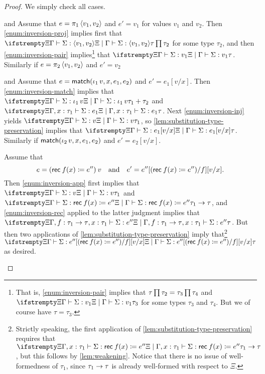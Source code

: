 \begin{proof}
We simply check all cases.
%
\begin{proofsec}
    \item[\ruleref{Eprojl} and \ruleref{Eprojr}]
    Assume that $e = \expProjl{\expPair{v_1}{v_2}}$ and $e' = v_1$ for values $v_1$ and $v_2$. Then \cref{enum:inversion-proj} implies first that $\typerel{\Xi}{\Gamma}{\Sigma}{\expPair{v_1}{v_2}}{\typeProd{\tau}{\tau_2}}$ for some type $\tau_2$, and then \cref{enum:inversion-pair} implies\footnote{That is, \cref{enum:inversion-pair} implies that $\typeProd{\tau}{\tau_2} = \typeProd{\tau_3}{\tau_4}$ and $\typerel{\Xi}{\Gamma}{\Sigma}{v_1}{\tau_3}$ for some types $\tau_3$ and $\tau_4$. But we of course have $\tau = \tau_3$.} that $\typerel{\Xi}{\Gamma}{\Sigma}{v_1}{\tau}$. Similarly if $e = \expProjr{\expPair{v_1}{v_2}}$ and $e' = v_2$

    \item[\ruleref{Ematchinjl} and \ruleref{Ematchinjr}]
    Assume that $e = \expMatch{\expInjl{v}}{x}{e_1}{e_2}$ and $e' = e_1[v/x]$. Then \cref{enum:inversion-match} implies that $\typerel{\Xi}{\Gamma}{\Sigma}{\expInjl{v}}{\typeSum{\tau_1}{\tau_2}}$ and $\typerel{\Xi}{\Gamma, \hastype{x}{\tau_1}}{\Sigma}{e_1}{\tau}$. Next \cref{enum:inversion-inj} yields $\typerel{\Xi}{\Gamma}{\Sigma}{v}{\tau_1}$, so \cref{lem:substitution-type-preservation} implies that $\typerel{\Xi}{\Gamma}{\Sigma}{e_1[v/x]}{\tau}$. Similarly if $\expMatch{\expInjr{v}}{x}{e_1}{e_2}$ and $e' = e_2[v/x]$.

    \item[\ruleref{Erecapp}]
    Assume that
    \begin{equation*}
        e = \expApp{\expRec*{f}{x}{e''}}{v}
        \quad \text{and} \quad
        e' = e''[\expRec*{f}{x}{e''}/f][v/x].
    \end{equation*}
    Then \cref{enum:inversion-app} first implies that $\typerel{\Xi}{\Gamma}{\Sigma}{v}{\tau_1}$ and $\typerel{\Xi}{\Gamma}{\Sigma}{\expRec{f}{x}{e''}}{\typeFunc{\tau_1}{\tau}}$, and \cref{enum:inversion-rec} applied to the latter judgment implies that $\typerel{\Xi}{\Gamma, \hastype{f}{\typeFunc{\tau_1}{\tau}}, \hastype{x}{\tau_1}}{\Sigma}{e''}{\tau}$. But then two applications of \cref{lem:substitution-type-preservation} imply that\footnote{Strictly speaking, the first application of \cref{lem:substitution-type-preservation} requires that $\typerel{\Xi}{\Gamma, \hastype{x}{\tau_1}}{\Sigma}{\expRec{f}{x}{e''}}{\typeFunc{\tau_1}{\tau}}$, but this follows by \cref{lem:weakening}. Notice that there is no issue of well-formedness of $\tau_1$, since $\typeFunc{\tau_1}{\tau}$ is already well-formed with respect to $\Xi$.} $\typerel{\Xi}{\Gamma}{\Sigma}{e''[\expRec*{f}{x}{e''}/f][v/x]}{\tau}$ as desired.


\end{proofsec}
\end{proof}
